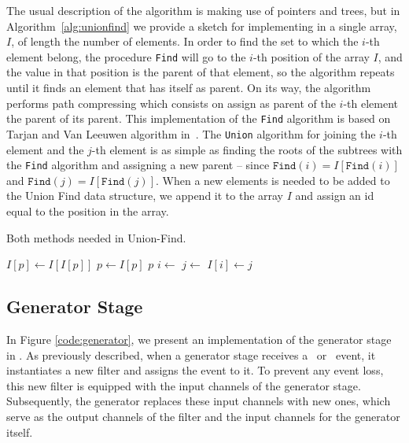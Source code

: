 The usual description of the algorithm is making use of pointers and trees, but in Algorithm~\ref{alg:unionfind} we provide a sketch for implementing in a single array, $I$, of length the number of elements. In order to find the set to which the $i$-th element belong, the procedure \texttt{Find} will go to the $i$-th position of the array $I$, and the value in that position is the parent of that element, so the algorithm repeats until it finds an element that has itself as parent. On its way, the algorithm performs path compressing which consists on assign as parent of the $i$-th element the parent of its parent. This implementation of the \texttt{Find} algorithm is based on Tarjan and Van Leeuwen algorithm in~\cite{Tarjan1984}. The \texttt{Union} algorithm for joining the $i$-th element and the $j$-th element is as simple as finding the roots of the subtrees with the \texttt{Find} algorithm and assigning a new parent -- since $\texttt{Find}(i) = I[\texttt{Find}(i)]$ and $\texttt{Find}(j) = I[\texttt{Find}(j)]$. When a new elements is needed to be added to the Union Find data structure, we append it to the array $I$ and assign an id equal to the position in the array.

\begin{algorithm}
\caption{ Both methods needed in Union-Find. \label{alg:unionfind}}
\begin{multicols}{2}
    \begin{algorithmic}
         
                \State $I[p] \gets I[I[p]]$
                \State $p \gets I[p]$
            \EndWhile
            \State \Return $p$
        \EndProcedure
        \columnbreak
         
            \State $i \gets $
            \State $j \gets $
            \State $I[i] \gets j$
        \EndProcedure
    \end{algorithmic}
\end{multicols}
\end{algorithm}


\subsection*{Generator Stage}
In Figure \ref{code:generator}, we present an implementation of the generator stage in \Go. As previously described, when a generator stage receives a \opinsert\ or \opupdate\ event, it instantiates a new filter and assigns the event to it. To prevent any event loss, this new filter is equipped with the input channels of the generator stage. Subsequently, the generator replaces these input channels with new ones, which serve as the output channels of the filter and the input channels for the generator itself.


